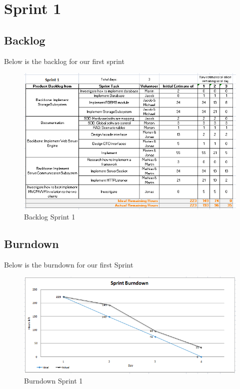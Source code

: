 \documentclass[]{report}
\begin{document}
\newpage
\chapter{Sprint 1}
\label{chap:Spring 1}


\section{Backlog}
Below is the backlog for our first sprint
\begin{figure}[h]
\includegraphics[scale=0.75]{img/backlogSprint1.png}
\caption{Backlog Sprint 1}
\label{fig:Backlog Sprint 1}
\end{figure}

\newpage
\section{Burndown}
Below is the burndown for our first Sprint
\begin{figure}[h]
\includegraphics[scale=0.7]{img/burndownSprint1.png}
\caption{Burndown Sprint 1}
\label{fig:Burndown Sprint 1}
\end{figure}
\end{document}
